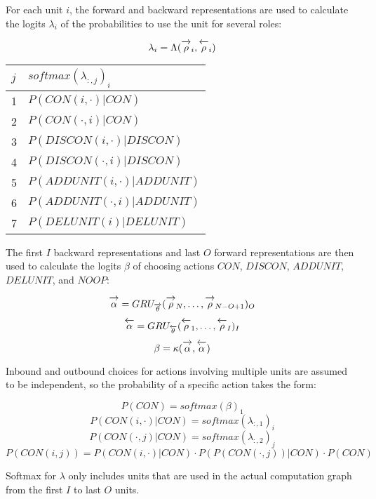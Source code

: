 \documentclass{article}[12px]
\newcommand{\ora}[1]{\overrightarrow{#1\vphantom{j}}}
\newcommand{\ola}[1]{\overleftarrow{#1\vphantom{j}}}
\begin{document}
For each unit \(i\), the forward and backward representations are used to calculate the logits \(\lambda_i\) of the probabilities to use the unit for several roles:

\begin{equation}
  \lambda_i = \Lambda(\ora{\rho}_i, \ola{\rho}_i)
\end{equation}

\begin{center}
  \begin{tabular}{| l | l |}
    \hline
    \(j\) & \(softmax(\lambda_{:,j})_i\) \\
    \hline
    1 & \(P(CON(i, \cdot) | CON)\) \\
    2 & \(P(CON(\cdot, i) | CON)\) \\
    3 & \(P(DISCON(i, \cdot) | DISCON)\) \\
    4 & \(P(DISCON(\cdot, i) | DISCON)\) \\
    5 & \(P(ADDUNIT(i, \cdot) | ADDUNIT)\) \\
    6 & \(P(ADDUNIT(\cdot, i) | ADDUNIT)\) \\
    7 & \(P(DELUNIT(i) | DELUNIT)\) \\
    \hline
  \end{tabular}
\end{center}

The first \(I\) backward representations and last \(O\) forward representations are then used to calculate the logits \(\beta\) of choosing actions \(CON\), \(DISCON\), \(ADDUNIT\), \(DELUNIT\), and \(NOOP\):

\begin{equation}
  \ora{\alpha} = GRU_{\ora{\theta}}(\ora{\rho}_{N}, \ldots, \ora{\rho}_{N-O+1})_O
\end{equation}
\begin{equation}
  \ola{\alpha} = GRU_{\ola{\theta}}(\ola{\rho}_1, \ldots, \ola{\rho}_I)_I
\end{equation}
\begin{equation}
  \beta = \kappa(\ora{\alpha}, \ola{\alpha})
\end{equation}

Inbound and outbound choices for actions involving multiple units are assumed to be independent, so the probability of a specific action takes the form:

\begin{equation}
  P(CON) = softmax(\beta)_1
\end{equation}
\begin{equation}
  P(CON(i, \cdot) | CON) = softmax(\lambda_{:, 1})_i
\end{equation}
\begin{equation}
  P(CON(\cdot, j) | CON) = softmax(\lambda_{:, 2})_j
\end{equation}
\begin{equation}
  P(CON(i, j)) = P(CON(i, \cdot) | CON) \cdot P(P(CON(\cdot, j)) | CON) \cdot P(CON)
\end{equation}

Softmax for \(\lambda\) only includes units that are used in the actual computation graph from the first \(I\) to last \(O\) units.

{}

\end{document}
